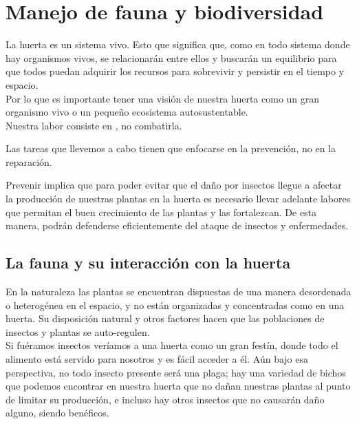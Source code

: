 \documentclass[../main.tex]{subfiles}
\begin{document}
\chapter{Manejo de fauna y biodiversidad}

La huerta es un sistema vivo. Esto que significa que, como en todo sistema donde hay organismos vivos, se relacionarán entre ellos y buscarán un equilibrio para que todos puedan adquirir los recursos para sobrevivir y persistir en el tiempo y espacio. \\

Por lo que es importante tener una visión de nuestra huerta como un gran organismo vivo o un pequeño ecosistema autosustentable. \\

Nuestra labor consiste en , no combatirla.

Las tareas que llevemos a cabo tienen que enfocarse en la prevención, no en la reparación.\\

\begin{recuadroV}
    Prevenir implica que para poder evitar que el daño por insectos llegue a afectar la producción de nuestras plantas en la huerta es necesario llevar adelante labores que permitan el buen crecimiento de las plantas y las fortalezcan. De esta manera, podrán defenderse eficientemente del ataque de insectos y enfermedades.
\end{recuadroV}



\section{La fauna y su interacción con la huerta}

En la naturaleza las plantas se encuentran dispuestas de una manera desordenada o heterogénea en el espacio, y no están organizadas y concentradas como en una huerta. Su disposición natural y otros factores hacen que las poblaciones de insectos y plantas se auto-regulen. \\

Si fuéramos insectos veríamos a una huerta como un gran festín, donde todo el alimento está servido para nosotros y es fácil acceder a él. Aún bajo esa perspectiva, no todo insecto presente será una plaga; hay una variedad de bichos que podemos encontrar en nuestra huerta que no dañan nuestras plantas al punto de limitar su producción, e incluso hay otros insectos que no causarán daño alguno, siendo benéficos. \\
\end{document}
